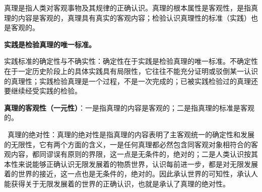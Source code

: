 {真理是指人类对客观事物及其规律的正确认识}。真理的根本属性是客观性，是指真理的内容是客观的，真理具有真实的客观内容；检验认识真理性的标准（实践）也是客观的。

\textbf{{实践是检验真理的唯一标准。}}

{实践标准的确定性与不确实性：}{确定性在于实践是检验真理的唯一标准。不确定性在于一定历史阶段上的具体实践具有局限性}{，它往往不能充分证明或驳倒某一认识的真理性；实践检验真理是一个过程，不是一次完成的；已被实践检验过的真理还要继续经受实践的检验。}

{}

\textbf{真理的客观性（一元性）}：一是指真理的内容是客观的；二是指真理的标准是客观的。

~真理的绝对性：真理的绝对性是指真理的内容表明了主客观统一的确定性和发展的无限性，它有两个方面的含义，一是任何真理都必然包含同客观对象相符合的客观内容，都同谬误有原则的界限，这一点是无条件的，绝对的；二是人类认识按其本性来说能够正确认识无限发展着的物质世界，认识每前进一步，都是对无限发展着的世界的接近，这一点也是无条件的，绝对的。因此承认世界的可知性，承认人能获得关于无限发展着的世界的正确认识，也就是承认了真理的绝对性。


